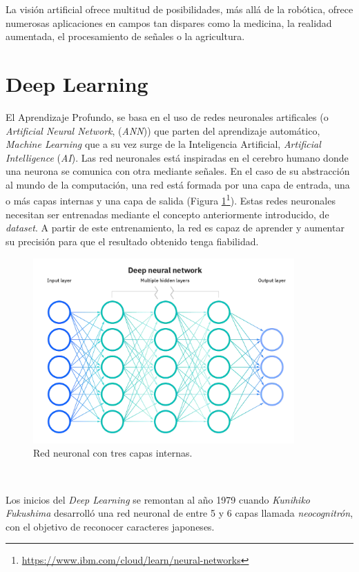 La visión artificial ofrece multitud de posibilidades, más allá de la robótica, ofrece numerosas aplicaciones en campos tan dispares como la medicina, la realidad aumentada, el procesamiento de señales o la agricultura.\\

\section{Deep Learning}
\label{sec:deeplearning}
El Aprendizaje Profundo, se basa en el uso de redes neuronales artificales (o {\textit{Artificial Neural Network}}, (\textit{ANN})) que parten del aprendizaje automático, \textit{Machine Learning} que a su vez surge de la Inteligencia Artificial, \textit{Artificial Intelligence} (\textit{AI}). Las red neuronales está inspiradas en el cerebro humano donde una neurona se comunica con otra mediante señales. En el caso de su abstracción al mundo de la computación, una red está formada por una capa de entrada, una o más capas internas y una capa de salida (Figura \ref{fig:neuralnetwork}\footnote{\url{https://www.ibm.com/cloud/learn/neural-networks}}). Estas redes neuronales necesitan ser entrenadas mediante el concepto anteriormente introducido, de \textit{dataset}. A partir de este entrenamiento, la red es capaz de aprender y aumentar su precisión para que el resultado obtenido tenga fiabilidad.\\

\begin{figure} [h!]
	\begin{center}
		\includegraphics[width=10cm]{figs/neuralnetwork}
	\end{center}
	\caption{Red neuronal con tres capas internas.}
	\label{fig:neuralnetwork}
\end{figure}\

Los inicios del \textit{Deep Learning} se remontan al año 1979 cuando \textit{Kunihiko Fukushima} desarrolló una red neuronal de entre 5 y 6 capas llamada \textit{neocognitrón}\cite{neocognitron}, con el objetivo de reconocer caracteres japoneses.\\

